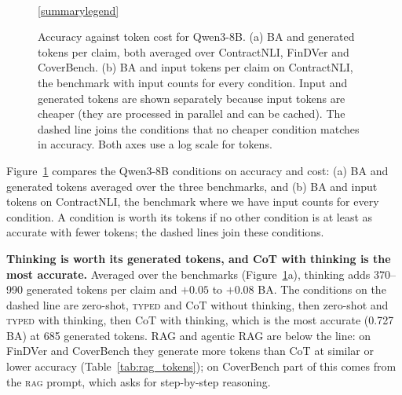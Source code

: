 \documentclass[11pt]{article}
\newcommand{\typed}{\textsc{typed}}
\begin{document}
\begin{figure}[t]
\\[2pt]
\ref{summarylegend}
\caption{Accuracy against token cost for Qwen3-8B. (a) BA and generated
tokens per claim, both averaged over ContractNLI, FinDVer and CoverBench.
(b) BA and input tokens per claim on ContractNLI, the benchmark with input
counts for every condition. Input and generated tokens are shown
separately because input tokens are cheaper (they are processed in
parallel and can be cached). The dashed line joins the conditions that no
cheaper condition matches in accuracy. Both axes use a log scale for
tokens.}
\label{fig:summary}
\end{figure}

Figure~\ref{fig:summary} compares the Qwen3-8B conditions on accuracy and
cost: (a) BA and generated tokens averaged over the three benchmarks, and
(b) BA and input tokens on ContractNLI, the benchmark where we have input
counts for every condition. A condition is worth its tokens if no other
condition is at least as accurate with fewer tokens; the dashed lines join
these conditions.

\noindent \textbf{Thinking is worth its generated tokens, and CoT with
thinking is the most accurate.} Averaged over the benchmarks
(Figure~\ref{fig:summary}a), thinking adds 370--990 generated tokens per
claim and $+0.05$ to $+0.08$ BA. The conditions on the dashed line are
zero-shot, \typed{} and CoT without thinking, then zero-shot and \typed{}
with thinking, then CoT with thinking, which is the most accurate (0.727
BA) at 685 generated tokens. RAG and agentic RAG are below the line: on
FinDVer and CoverBench they generate more tokens than CoT at similar or
lower accuracy (Table~\ref{tab:rag_tokens}); on CoverBench part of this
comes from the \textsc{rag} prompt, which asks for step-by-step reasoning.
\end{document}
